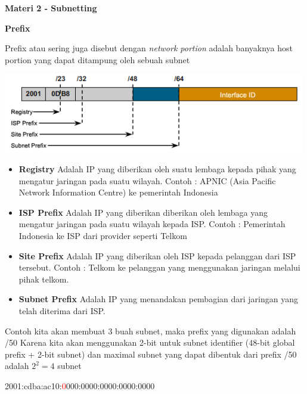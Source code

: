 \documentclass{article}
\begin{document}
    \begin{flushleft}
        \textbf{Materi 2 - Subnetting}
        \newline

        \textbf{Prefix}

        Prefix atau sering juga disebut dengan \textit{network portion} adalah banyaknya host portion yang dapat ditampung oleh sebuah subnet

        \includegraphics[scale=0.6]{ipv6-structure.png}

        \begin{itemize}
            \item[] \textbf{Registry} \newline
            Adalah IP yang diberikan oleh suatu lembaga kepada pihak yang mengatur jaringan pada suatu wilayah.
            Contoh : APNIC (Asia Pacific Network Information Centre) ke pemerintah Indonesia
            \item[] \textbf{ISP Prefix} \newline
            Adalah IP yang diberikan diberikan oleh lembaga yang mengatur jaringan pada suatu wilayah kepada ISP.
            Contoh : Pemerintah Indonesia ke ISP dari provider seperti Telkom
            \item[] \textbf{Site Prefix} 
            Adalah IP yang diberikan oleh ISP kepada pelanggan dari ISP tersebut.
            Contoh : Telkom ke pelanggan yang menggunakan jaringan melalui pihak telkom.
            \item[] \textbf{Subnet Prefix}
            Adalah IP yang menandakan pembagian dari jaringan yang telah diterima dari ISP.
        \end{itemize}

        Contoh kita akan membuat 3 buah subnet, maka prefix yang digunakan adalah /50 
        Karena kita akan menggunakan 2-bit untuk subnet identifier (48-bit global prefix + 2-bit subnet) dan maximal subnet yang dapat dibentuk dari prefix /50 adalah $2^2 = 4$ subnet

        \begin{center}
            2001:cdba:ac10:\textcolor{red}{0}000:0000:0000:0000:0000
        \end{center}


\end{flushleft}
\end{document}
